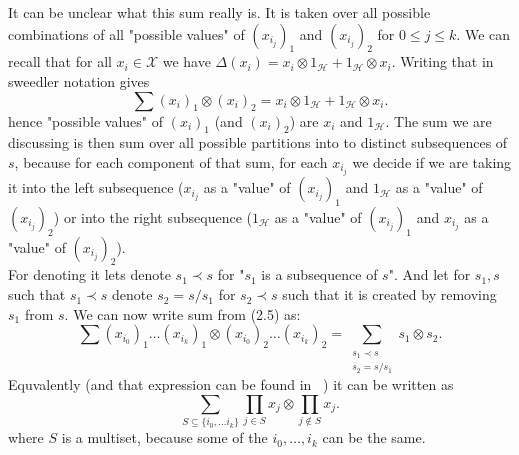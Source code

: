 \documentclass[a4paper, 12pt]{report}
\begin{document}
It can be unclear what this sum really is. It is taken over all possible combinations of all "possible 
values" of $(x_{i_j})_1$ and $(x_{i_j})_2$ for $ 0 \leq j \leq k$. We can recall that for all 
$x_i \in \mathcal{X}$ we 
have $\Delta(x_i) = x_i \otimes 1_\mathcal{H} + 1_\mathcal{H} \otimes x_i$. Writing that in sweedler 
notation gives
\begin{equation*}
\sum(x_i)_1 \otimes (x_i)_2 = x_i \otimes 1_\mathcal{H} + 1_\mathcal{H} \otimes x_i.
\end{equation*}
hence "possible values" of $(x_i)_1$ (and $(x_i)_2$) are $x_i$ and $1_\mathcal{H}$.
The sum we are discussing is then sum over all possible partitions into to distinct subsequences of $s$, 
because for each component of that sum, for each $x_{i_j}$ we decide if we are taking it into the left 
subsequence ($x_{i_j}$ as a "value" of $(x_{i_j})_1$ and $1_\mathcal{H}$ as a "value" of $(x_{i_j})_2$) or 
into the right subsequence ($1_\mathcal{H}$ as a "value" of $(x_{i_j})_1$ and $x_{i_j}$ as a "value" of 
$(x_{i_j})_2$).
\\ For denoting it lets denote $s_1 \prec s$ for "$s_1$ is a subsequence of $s$". And let for $s_1, s$ 
such that $s_1 \prec s$ denote $s_2 = s / s_1$ for $s_2 \prec s$ such that it is created by removing 
$s_1$ from $s$. We can now write sum from (2.5) as:
\begin{equation*}
\sum (x_{i_0})_1 \dots (x_{i_k})_1 \otimes (x_{i_0})_2 \dots (x_{i_k})_2 =
\sum_{\substack{s_1 \prec s \\ s_2 = s / s_1}} s_1 \otimes s_2.
\end{equation*}
Equvalently (and that expression can be found in ~\cite{Diaconis2014}) it can be written as
\begin{equation*}
\sum_{S \subseteq \{ i_0, \dots i_k \} } \prod_{j \in S} x_j \otimes \prod_{j \notin S} x_j.
\end{equation*}
where $S$ is a multiset, because some of the $i_0, \dots, i_k$ can be the same.
\end{document}
